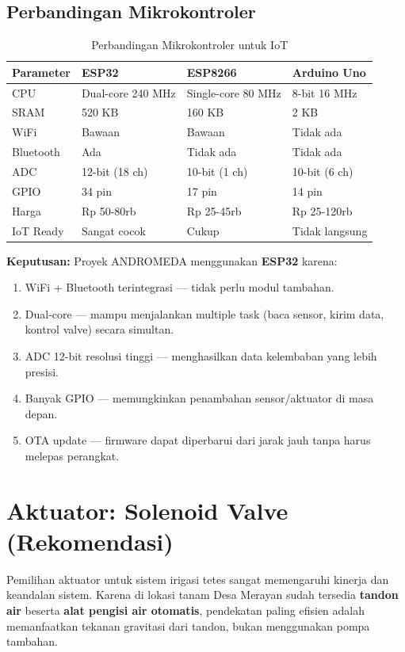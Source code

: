 \documentclass[12pt,a4paper,oneside]{report}
\begin{document}
\subsection{Perbandingan Mikrokontroler}

\begin{table}[H]
\centering
\caption{Perbandingan Mikrokontroler untuk IoT}
\label{tab:mcu-compare}
\begin{tabular}{p{2.5cm} p{3.5cm} p{3.5cm} p{3.5cm}}
\toprule
\textbf{Parameter} & \textbf{ESP32} & \textbf{ESP8266} & \textbf{Arduino Uno} \\
\midrule
CPU & Dual-core 240 MHz & Single-core 80 MHz & 8-bit 16 MHz \\
SRAM & 520 KB & 160 KB & 2 KB \\
WiFi & Bawaan & Bawaan & Tidak ada \\
Bluetooth & Ada & Tidak ada & Tidak ada \\
ADC & 12-bit (18 ch) & 10-bit (1 ch) & 10-bit (6 ch) \\
GPIO & 34 pin & 17 pin & 14 pin \\
Harga & Rp 50-80rb & Rp 25-45rb & Rp 25-120rb \\
IoT Ready & Sangat cocok & Cukup & Tidak langsung \\
\bottomrule
\end{tabular}
\end{table}

\textbf{Keputusan:} Proyek ANDROMEDA menggunakan \textbf{ESP32} karena:
\begin{enumerate}
    \item WiFi + Bluetooth terintegrasi — tidak perlu modul tambahan.
    \item Dual-core — mampu menjalankan multiple task (baca sensor, kirim data, kontrol valve) secara simultan.
    \item ADC 12-bit resolusi tinggi — menghasilkan data kelembaban yang lebih presisi.
    \item Banyak GPIO — memungkinkan penambahan sensor/aktuator di masa depan.
    \item OTA update — firmware dapat diperbarui dari jarak jauh tanpa harus melepas perangkat.
\end{enumerate}

\section{Aktuator: Solenoid Valve (Rekomendasi)}

Pemilihan aktuator untuk sistem irigasi tetes sangat memengaruhi kinerja dan keandalan sistem. Karena di lokasi tanam Desa Merayan sudah tersedia \textbf{tandon air} beserta \textbf{alat pengisi air otomatis}, pendekatan paling efisien adalah memanfaatkan tekanan gravitasi dari tandon, bukan menggunakan pompa tambahan.
\end{document}
